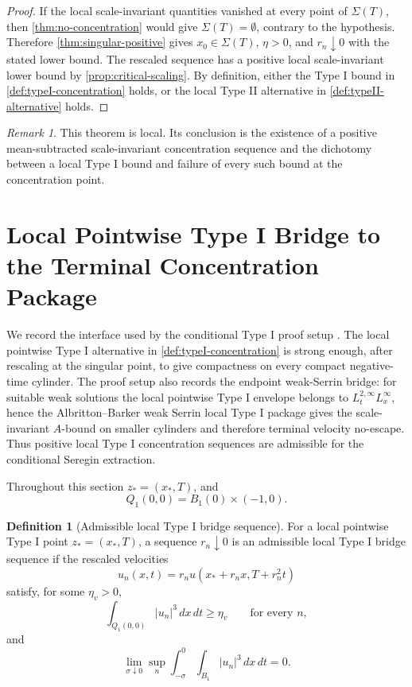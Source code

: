 \documentclass[11pt]{amsart}
\theoremstyle{plain}
\theoremstyle{definition}
\newtheorem{definition}[definition]{Definition}
\theoremstyle{remark}
\newtheorem{remark}[remark]{Remark}
\begin{document}
\begin{proof}
If the local scale-invariant quantities vanished at every point of
\(\Sigma(T)\), then \cref{thm:no-concentration} would give
\(\Sigma(T)=\emptyset\), contrary to the hypothesis.  Therefore
\cref{thm:singular-positive} gives
\(x_0\in\Sigma(T)\), \(\eta>0\), and \(r_n\downarrow0\) with the stated lower
bound.  The rescaled sequence has a positive local scale-invariant lower bound
by \cref{prop:critical-scaling}.  By definition, either the Type I bound in
\cref{def:typeI-concentration} holds, or the local Type II alternative in
\cref{def:typeII-alternative} holds.
\end{proof}

\begin{remark}
This theorem is local.  Its conclusion is the existence of a positive
mean-subtracted scale-invariant concentration sequence and the dichotomy
between a local Type I bound and failure of every such bound at the
concentration point.
\end{remark}

\section{Local Pointwise Type I Bridge to the Terminal Concentration Package}
\label{sec:local-typeI-terminal-bridge-paper0}

We record the interface used by the conditional Type I proof setup
\cite{ProofSetupTypeI}.  The local pointwise Type I alternative in
\cref{def:typeI-concentration} is strong enough, after rescaling at the singular
point, to give compactness on every compact negative-time cylinder.  The
proof setup also records the endpoint weak-Serrin bridge:
for suitable weak solutions the local pointwise Type I envelope belongs to
\(L^{2,\infty}_tL^\infty_x\), hence the Albritton--Barker weak Serrin local
Type I package gives the scale-invariant \(A\)-bound on smaller cylinders and
therefore terminal velocity no-escape.  Thus positive local Type I
concentration sequences are admissible for the conditional Seregin extraction.

Throughout this section \(z_*=(x_*,T)\), and
\[
  Q_1(0,0)=B_1(0)\times(-1,0).
\]

\begin{definition}[Admissible local Type I bridge sequence]
\label{def:paper0-admissible-local-bridge-sequence}
For a local pointwise Type I point \(z_*=(x_*,T)\), a sequence
\(r_n\downarrow0\) is an admissible local Type I bridge sequence if the rescaled
velocities
\[
  u_n(x,t)=r_nu(x_*+r_nx,T+r_n^2t)
\]
satisfy, for some \(\eta_v>0\),
\[
   \int_{Q_1(0,0)} |u_n|^3\,dx\,dt\ge\eta_v
   \qquad\text{for every }n,
\]
and
\[
   \lim_{\sigma\downarrow0}
   \sup_n
   \int_{-\sigma}^{0}\int_{B_1}|u_n|^3\,dx\,dt=0 .
\]
\end{definition}
\end{document}
